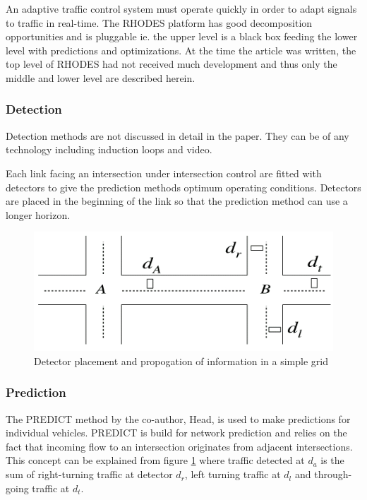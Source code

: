 An adaptive traffic control system must operate quickly in order to adapt signals to traffic in real-time. The RHODES platform has good decomposition opportunities and is pluggable ie. the upper level is a black box feeding the lower level with predictions and optimizations. At the time the article was written, the top level of RHODES had not received much development and thus only the middle and lower level are described herein.

\subsubsection*{Detection}
Detection methods are not discussed in detail in the paper. They can be of any technology including induction loops and video. 

Each link facing an intersection under intersection control are fitted with detectors to give the prediction methods optimum operating conditions. Detectors are placed in the beginning of the link so that the prediction method can use a longer horizon.

\begin{figure}[!ht]
\begin{center}
\includegraphics[scale=0.5]{rhodes_prediction-strategy.png} 
\end{center}
\caption{Detector placement and propogation of information in a simple grid}
\label{fig:rhodes_predict}
\end{figure}

\subsubsection*{Prediction}
The PREDICT method by the co-author, Head, is used to make predictions for individual vehicles. PREDICT is build for network prediction and relies on the fact that incoming flow to an intersection originates from adjacent intersections. This concept can be explained from figure \ref{fig:rhodes_predict} where traffic detected at $d_a$ is the sum of right-turning traffic at detector $d_r$, left turning traffic at $d_l$ and through-going traffic at $d_t$.


